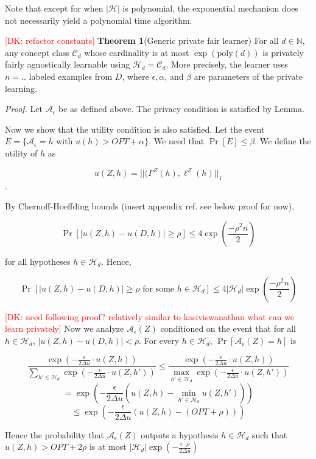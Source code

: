 \documentclass[format = sigconf]{acmart}
\newcommand{\dk}[1]{\textcolor{red}{[DK: #1]}}
\newcommand{\A}{\mathcal{A}}
\renewcommand{\H}{\mathcal{H}}
\renewcommand{\C}{\mathcal{C}}
\newcommand{\1}{\mathbbm{1}}
\theoremstyle{definition}
\begin{document}
Note that except for when $|\H|$ is polynomial, the exponential mechanism does not necessarily yield a polynomial time algorithm.

\dk{refactor constants}
{\bf Theorem 1}(Generic private fair learner) For all $d \in \mathbb{N}$, any concept class $\mathcal{C}_d$ whose cardinality is at most $\exp(\text{poly}(d))$ is privately fairly agnostically learnable using $\H_d = \C_d$. More precisely, the learner uses $n = ..$ labeled examples from $D$, where $\epsilon, \alpha$, and $\beta$ are parameters of the private learning.

{\it Proof.} Let $\A_{\epsilon}$ be as defined above. The privacy condition is satisfied by Lemma.

Now we show that the utility condition is also satisfied. Let the event $E = \{\A_{\epsilon} = h \text{ with } u(h) > OPT + \alpha\}$. We need that $\Pr[E] \leq \beta$. We define the utility of $h$ as

$$u(Z,h) = ||(\Gamma^Z(h), \ell^Z(h)||_{1}$$.

By Chernoff-Hoeffding bounds (insert appendix ref. see below proof for now),



$$\Pr[|u(Z,h) - u(D,h)| \geq \rho] \leq 4\exp(\frac{-\rho^2n}{2})$$

for all hypotheses $h \in \H_d$. Hence,

$$\Pr[|u(Z,h) - u(D,h)| \geq \rho \text{ for some } h \in \H_d] \leq 4|\H_d|\exp(\frac{-\rho^2n}{2})$$

\dk{need following proof? relatively similar to kasiviswanathan what can we learn privately}
Now we analyze $\A_\epsilon(Z)$ conditioned on the event that for all $h\in \H_d$, $|u(Z,h) - u(D,h)| < \rho$. For every $h \in \H_d$, $\Pr[\A_\epsilon(Z) = h]$ is

$$\frac{\exp(-\frac{\epsilon}{2\Delta u} \cdot u(Z,h))}{\sum_{h'\in\H_d}\exp(-\frac{\epsilon}{2\Delta u} \cdot u(Z,h'))} \leq \frac{\exp(-\frac{\epsilon}{2\Delta u} \cdot u(Z,h))}{\max_{h'\in\H_d}\exp(-\frac{\epsilon}{2\Delta u} \cdot u(Z,h'))} $$
$$= \exp(-\frac{\epsilon}{2\Delta u}(u(Z,h) - \min_{h'\in\H_d}u(Z,h')))$$
$$\leq \exp(-\frac{\epsilon}{2\Delta u}(u(Z,h) - (OPT + \rho)))$$

Hence the probability that $\A_\epsilon(Z)$ outputs a hypothesis $h \in \H_d$ such that $u(Z,h) > OPT + 2\rho$ is at most $|\H_d|\exp(-\frac{\epsilon\cdot\rho}{2\Delta u})$
\end{document}
